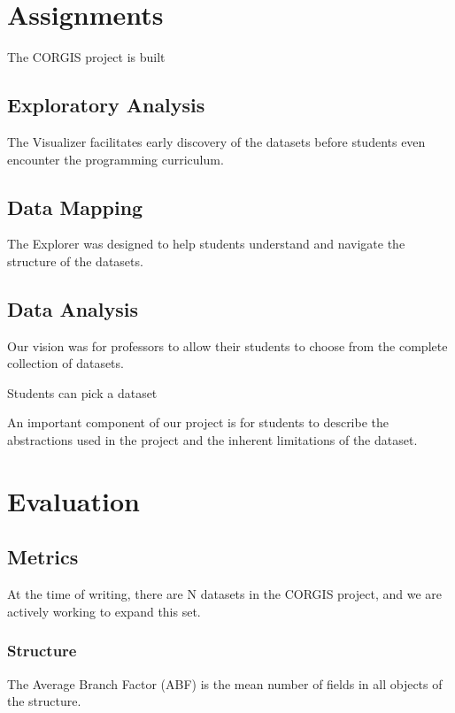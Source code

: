 \documentclass{sig-alternate}
\begin{document}
\section{Assignments}

The CORGIS project is built 

\subsection{Exploratory Analysis}

The Visualizer facilitates early discovery of the datasets before students even encounter the programming curriculum.

\subsection{Data Mapping}

The Explorer was designed to help students understand and navigate the structure of the datasets.

\subsection{Data Analysis}

Our vision was for professors to allow their students to choose from the complete collection of datasets.

Students can pick a dataset

An important component of our project is for students to describe the abstractions used in the project and the inherent limitations of the dataset.

\section{Evaluation}

\subsection{Metrics}

At the time of writing, there are N datasets in the CORGIS project, and we are actively working to expand this set.

\subsubsection{Structure}

The Average Branch Factor (ABF) is the mean number of fields in all objects of the structure.
\end{document}
